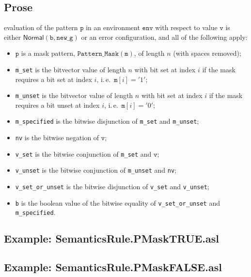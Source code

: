 \documentclass{book}
\newcommand\Normal[0]{\textsf{Normal}}
\newcommand\env[0]{\texttt{env}}
\newcommand\newg[0]{\texttt{new\_g}}
\newcommand\vm[0]{\texttt{m}}
\newcommand\vp[0]{\texttt{p}}
\newcommand\vv[0]{\texttt{v}}
\newcommand\vb[0]{\texttt{b}}
\begin{document}
    \subsection{Prose}
    evaluation of the pattern $\vp$ in an environment $\env$ with
    respect to value $\vv$ is either $\Normal(\vb, \newg)$ or an error configuration,
    and all of the following apply:
    \begin{itemize}
      \item $\vp$ is a mask pattern, $\texttt{Pattern\_Mask}(\vm)$,
      of length $n$ (with spaces removed);
      \item \texttt{m\_set} is the bitvector value of length $n$ with bit set
        at index $i$ if the mask requires a bit set at index $i$, i.\,e.\
        $\texttt{m}[i] = '1'$;
      \item \texttt{m\_unset} is the bitvector value of length $n$ with bit set
        at index $i$ if the mask requires a bit unset at index $i$, i.\,e.\
        $\texttt{m}[i] = '0'$;
      \item \texttt{m\_specified} is the bitwise disjunction of \texttt{m\_set}
        and \texttt{m\_unset};
      \item \texttt{nv} is the bitwise negation of $\vv$;
      \item \texttt{v\_set} is the bitwise conjunction of \texttt{m\_set} and
        $\vv$;
      \item \texttt{v\_unset} is the bitwise conjunction of \texttt{m\_unset} and
        \texttt{nv};
      \item \texttt{v\_set\_or\_unset} is the bitwise disjunction of
        \texttt{v\_set} and \texttt{v\_unset};
      \item \texttt{b} is the boolean value of the bitwise equality of
        \texttt{v\_set\_or\_unset} and \texttt{m\_specified}.
    \end{itemize}

    \subsection{Example: SemanticsRule.PMaskTRUE.asl}

    \subsection{Example: SemanticsRule.PMaskFALSE.asl}
\end{document}
